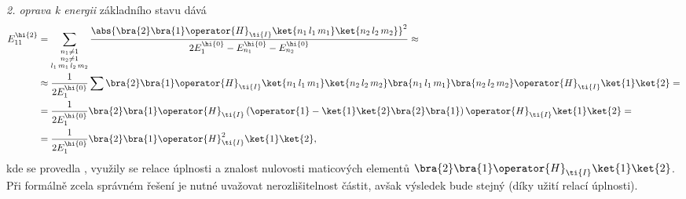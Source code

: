 \begin{solution}
	\emph{2. oprava k energii} základního stavu dává
	\begin{align}
        E_{11}^{\hi{2}}
            &=\sum_{\substack{n_{1}\neq1 \\ n_{2}\neq1 \\ l_{1}\,m_{1}\,l_{2}\,m_{2}}}
                \frac{\abs{\bra{2}\bra{1}\operator{H}_{\ti{I}}\ket{n_{1}\,l_{1}\,m_{1}}\ket{n_{2}\,l_{2}\,m_{2}}}^{2}}
                {2E_{1}^{\hi{0}}-E_{n_{1}}^{\hi{0}}-E_{n_{2}}^{\hi{0}}}\approx\nonumber\\
            &\approx\frac{1}{2E_{1}^{\hi{0}}}\sum\bra{2}\bra{1}\operator{H}_{\ti{I}}\ket{n_{1}\,l_{1}\,m_{1}}\ket{n_{2}\,l_{2}\,m_{2}}
                \bra{n_{1}\,l_{1}\,m_{1}}\bra{n_{2}\,l_{2}\,m_{2}}\operator{H}_{\ti{I}}\ket{1}\ket{2}=\nonumber\\
            &=\frac{1}{2E_{1}^{\hi{0}}}\bra{2}\bra{1}\operator{H}_{\ti{I}}\left(\operator{1}-
                \ket{1}\ket{2}\bra{2}\bra{1}\right)\operator{H}_{\ti{I}}\ket{1}\ket{2}=\nonumber\\
            &=\frac{1}{2E_{1}^{\hi{0}}}\bra{2}\bra{1}\operator{H}_{\ti{I}}^{2}\ket{1}\ket{2},
	\end{align}
	kde se provedla , využily se relace úplnosti a znalost nulovosti maticových elementů $\bra{2}\bra{1}\operator{H}_{\ti{I}}\ket{1}\ket{2}$.
	Při formálně zcela správném řešení je nutné uvažovat nerozlišitelnost částit, avšak výsledek bude stejný (díky užití relací úplnosti).


\end{solution}
